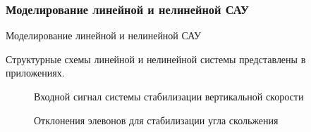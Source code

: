     \subsubsection{Моделирование линейной и нелинейной САУ}Моделирование линейной и нелинейной САУ

Структурные схемы линейной и нелинейной системы представлены в приложениях.

\begin{figure}[H]
    \caption{Входной сигнал системы стабилизации вертикальной скорости }
    \label{fig:Входной сигнал системы стабилизации вертикальной скорости}
\end{figure}

\begin{figure}[H]
    \caption{Отклонения элевонов для стабилизации угла скольжения}
    \label{fig:Отклонения элевонов для стабилизации угла скольжения}
\end{figure}

